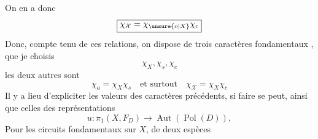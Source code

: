 On en a donc
\[\boxed{\chi_{\mathcal X}=\chi_{\unsure{o|X}}\chi_c}\]
Donc, compte tenu de ces relations, on dispose de trois caractères fondamentaux , que je choisis
\[\chi_X,\chi_s,\chi_c\]
 les deux autres sont
\[\chi_a=\chi_X\chi_s\quad\text{et surtout}\quad\chi_{\mathcal X}=\chi_X\chi_c\]
Il y a lieu d'expliciter les valeurs des caractères précédents, si faire se peut, ainsi que celles des représentations
\[u:\pi_1(X,F_D)\longrightarrow\operatorname{Aut}(\operatorname{Pol}(D)),\]
Pour les circuits fondamentaux sur $X$,  de deux espèces

